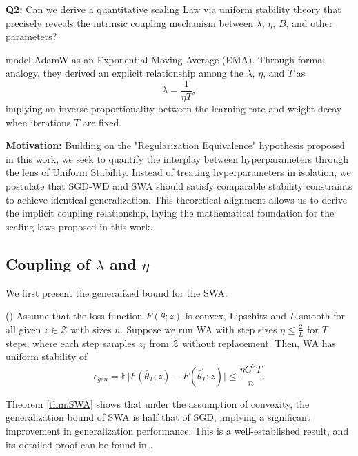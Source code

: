 \begin{tcolorbox}
\textbf{Q2:} Can we derive a quantitative scaling Law via uniform stability theory that precisely reveals the intrinsic coupling mechanism between $\lambda$, $\eta$, $B$, and other parameters?
\end{tcolorbox}

\citet{wang2025setadamwsweightdecay} model AdamW as an Exponential Moving Average (EMA). Through formal analogy, they derived an explicit relationship among the $\lambda$, $\eta$, and $T$ as
\begin{equation}
 \lambda = \frac{1}{\eta T} ,   
\end{equation}
implying an inverse proportionality between the learning rate and weight decay when iterations $T$ are fixed. 

\textbf{Motivation:} Building on the "Regularization Equivalence" hypothesis proposed in this work, we seek to quantify the interplay between hyperparameters through the lens of Uniform Stability. Instead of treating hyperparameters in isolation, we postulate that SGD-WD and SWA should satisfy comparable stability constraints to achieve identical generalization. This theoretical alignment allows us to derive the implicit coupling relationship, laying the mathematical foundation for the scaling laws proposed in this work.

\subsection{Coupling of $\lambda$ and $\eta$}
We first present the generalized bound for the SWA.

\begin{lemma}{\rm (\citet[Theorem 4.1]{pmlr-v235-wang24bl})}\label{thm:SWA}
Assume that the loss function $F(\theta;z)$ is convex, Lipschitz and $L$-smooth for all given $z\in\mathcal{Z}$ with sizes $n$. Suppose we run WA with step sizes $\eta \leq \frac{2}{L}$ for $T$ steps, where each step samples $z_i$ from $\mathcal{Z}$ without replacement. Then, WA has uniform stability of
\begin{equation}
  \epsilon_{gen} = \mathbb{E}\vert F(\bar{\theta}_T;z)-F(\bar{\theta}^{\prime}_T;z)\vert \leq \frac{\eta G^2 T}{n}.
 \end{equation}
\end{lemma}

\begin{remark}
Theorem \ref{thm:SWA} shows that under the assumption of convexity, the generalization bound of SWA is half that of SGD, implying a significant improvement in generalization performance. This is a well-established result, and its detailed proof can be found in \cite{pmlr-v235-wang24bl,hardt2016train,xiao2022stability}. 
\end{remark}

